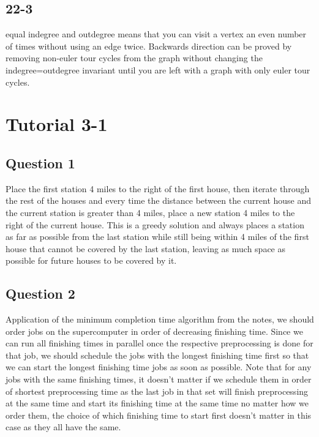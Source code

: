 \documentclass[11pt]{article}
\begin{document}
\subsection{22-3}

equal indegree and outdegree means that you can visit a vertex an even number of times without using an edge twice. Backwards direction can be proved by removing non-euler tour cycles from the graph without changing the indegree=outdegree invariant until you are left with a graph with only euler tour cycles.

\section{Tutorial 3-1}

\subsection{Question 1}

Place the first station 4 miles to the right of the first house, then iterate through the rest of the houses and every time the distance between the current house and the current station is greater than 4 miles, place a new station 4 miles to the right of the current house. This is a greedy solution and always places a station as far as possible from the last station while still being within 4 miles of the first house that cannot be covered by the last station, leaving as much space as possible for future houses to be covered by it.

\subsection{Question 2}

Application of the minimum completion time algorithm from the notes, we should order jobs on the supercomputer in order of decreasing finishing time. Since we can run all finishing times in parallel once the respective preprocessing is done for that job, we should schedule the jobs with the longest finishing time first so that we can start the longest finishing time jobs as soon as possible. Note that for any jobs with the same finishing times, it doesn't matter if we schedule them in order of shortest preprocessing time as the last job in that set will finish preprocessing at the same time and start its finishing time at the same time no matter how we order them, the choice of which finishing time to start first doesn't matter in this case as they all have the same.
\end{document}
